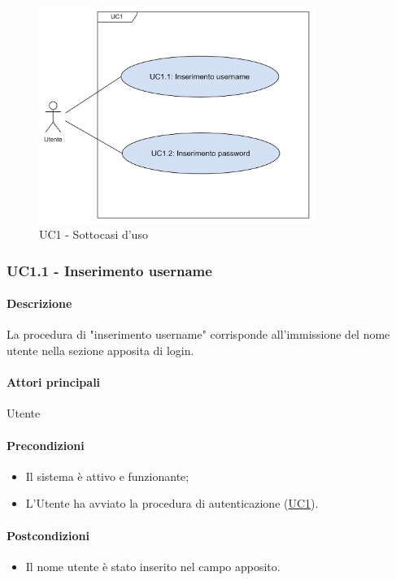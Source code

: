 \begin{figure}[H]
  \centering
  \includegraphics[width=0.80\textwidth]{assets/uc1_1.png}
  \caption{UC1 - Sottocasi d'uso}
\end{figure}


\subsubsection{UC1.1 - Inserimento username}\label{UC1point1}

\paragraph*{Descrizione}
La procedura di "inserimento username" corrisponde all'immissione del nome utente nella sezione apposita di login.

\paragraph*{Attori principali}
Utente

\paragraph*{Precondizioni}
\begin{itemize}
  \item Il sistema è attivo e funzionante;
  \item L'Utente ha avviato la procedura di autenticazione (\hyperref[UC1]{UC1}).  
\end{itemize}

\paragraph*{Postcondizioni}
\begin{itemize}
  \item Il nome utente è stato inserito nel campo apposito.
\end{itemize}

